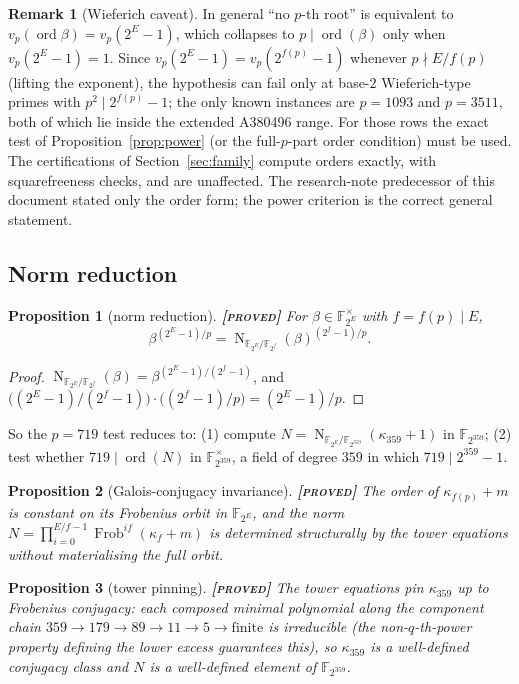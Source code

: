 \documentclass[11pt]{article}
\theoremstyle{plain}
\newtheorem{proposition}{Proposition}
\theoremstyle{definition}
\newtheorem{remark}{Remark}
\newcommand{\F}{\mathbb{F}}
\newcommand{\ord}{\operatorname{ord}}
\newcommand{\Norm}{\operatorname{N}}
\newcommand{\Frob}{\operatorname{Frob}}
\newcommand{\PROVED}{\textbf{[\textsc{proved}]}}
\begin{document}
\begin{remark}[Wieferich caveat]\label{rem:wieferich}
In general ``no $p$-th root'' is equivalent to
$v_p(\ord\beta)=v_p(2^E-1)$, which collapses to
$p\mid\ord(\beta)$ only when $v_p(2^E-1)=1$. Since
$v_p(2^E-1)=v_p(2^{f(p)}-1)$ whenever $p\nmid E/f(p)$ (lifting the
exponent), the hypothesis can fail only at base-$2$ Wieferich-type primes
with $p^2\mid 2^{f(p)}-1$; the only known instances are $p=1093$ and
$p=3511$, both of which lie inside the extended A380496 range. For those
rows the exact test of Proposition~\ref{prop:power} (or the full-$p$-part
order condition) must be used. The certifications of
Section~\ref{sec:family} compute orders exactly, with squarefreeness
checks, and are unaffected. The research-note predecessor of this
document stated only the order form; the power criterion is the
correct general statement.
\end{remark}

\subsection{Norm reduction}

\begin{proposition}[norm reduction]\label{prop:norm}
\PROVED{} For $\beta\in\F_{2^E}^{\times}$ with $f=f(p)\mid E$,
\[
  \beta^{(2^E-1)/p}
  =
  \Norm_{\F_{2^E}/\F_{2^f}}(\beta)^{(2^f-1)/p}.
\]
\end{proposition}

\begin{proof}
$\Norm_{\F_{2^E}/\F_{2^f}}(\beta)=\beta^{(2^E-1)/(2^f-1)}$, and
$\bigl((2^E-1)/(2^f-1)\bigr)\cdot\bigl((2^f-1)/p\bigr)=(2^E-1)/p$.
\end{proof}

So the $p=719$ test reduces to: (1) compute
$N=\Norm_{\F_{2^E}/\F_{2^{359}}}(\kappa_{359}+1)$ in $\F_{2^{359}}$;
(2) test whether $719\mid\ord(N)$ in $\F_{2^{359}}^{\times}$, a field of
degree $359$ in which $719\mid2^{359}-1$.

\begin{proposition}[Galois-conjugacy invariance]\label{prop:galois}
\PROVED{} The order of $\kappa_{f(p)}+m$ is constant on its Frobenius
orbit in $\F_{2^E}$, and the norm
$N=\prod_{i=0}^{E/f-1}\Frob^{if}(\kappa_{f}+m)$ is determined
structurally by the tower equations without materialising the full orbit.
\end{proposition}

\begin{proposition}[tower pinning]\label{prop:pinning}
\PROVED{} The tower equations pin $\kappa_{359}$ up to Frobenius
conjugacy: each composed minimal polynomial along the component chain
$359\to179\to89\to11\to5\to\text{finite}$ is irreducible (the
non-$q$-th-power property defining the lower excess guarantees this), so
$\kappa_{359}$ is a well-defined conjugacy class and $N$ is a well-defined
element of $\F_{2^{359}}$.
\end{proposition}
\end{document}
